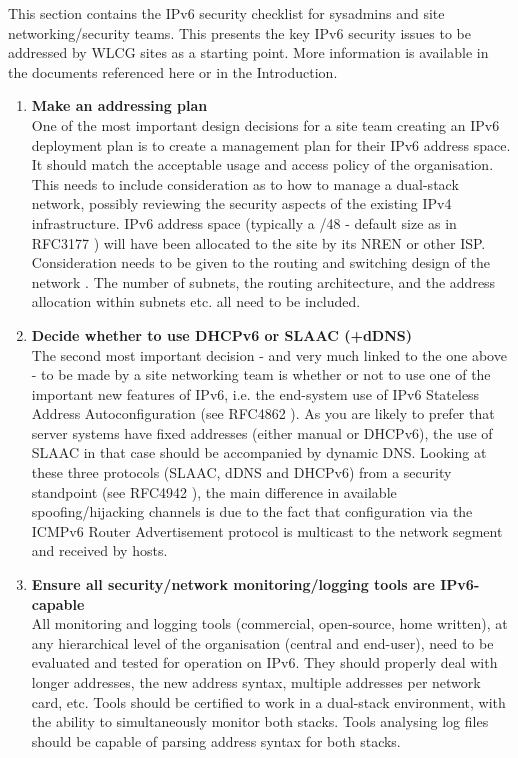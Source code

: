 
This section contains the IPv6 security checklist for sysadmins and site
networking/security teams. This presents the key IPv6 security issues to be
addressed by WLCG sites as a starting point. More information is available in
the documents referenced here or in the Introduction. 



\begin{enumerate}


\item {\bf Make an addressing plan}\\
One of the most important design decisions for a site team creating
an IPv6 deployment plan is to create a management plan for their IPv6 address space.
It should match the acceptable usage and access policy of the organisation.
This needs to include consideration as to how to manage a dual-stack network,
possibly reviewing the security aspects of the existing IPv4 infrastructure.
IPv6 address space (typically a /48 - default size as in RFC3177 \cite{rfc})
will have been allocated to the site by its NREN or other ISP. Consideration
needs to be given to the routing and switching design of the network
\cite{planningguides}. The number of subnets, the routing architecture,
and the address allocation within subnets etc. all need to be included. 


\item {\bf Decide whether to use DHCPv6 or SLAAC (+dDNS)} \\
The second most important decision - and very much linked to the one above -
to be made by a site networking team is whether or not to use one of the important
new features of IPv6, i.e. the end-system use of  IPv6 Stateless Address
Autoconfiguration (see RFC4862 \cite{rfc}).
As you are likely to prefer that server systems have fixed addresses
(either manual or DHCPv6), the use of SLAAC in that case should be accompanied by
dynamic DNS. Looking at these three protocols (SLAAC, dDNS and DHCPv6) from a
security standpoint (see RFC4942 \cite{rfc}), the main difference in available
spoofing/hijacking channels is due to the fact that configuration via the ICMPv6
Router Advertisement protocol is multicast to the network segment and received
by hosts.


\item {\bf Ensure all security/network monitoring/logging tools are IPv6-capable}\\
All monitoring and logging tools (commercial, open-source, home written),
at any hierarchical level of the organisation (central and end-user),
need to be evaluated and tested for operation on IPv6.
They should properly deal with longer addresses, the new address syntax, multiple
addresses per network card, etc.
Tools should be certified to work in a dual-stack environment, with the
ability to simultaneously monitor both stacks. Tools analysing log files
should be capable of parsing address syntax for both stacks.


\end{enumerate}
